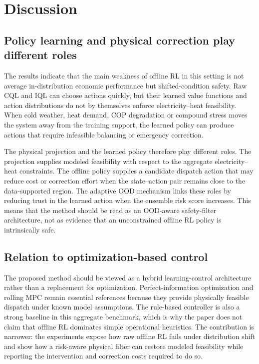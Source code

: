 \documentclass[preprint,12pt]{elsarticle}
\begin{document}
\section{Discussion}

\subsection{Policy learning and physical correction play different roles}

The results indicate that the main weakness of offline RL in this setting is not average in-distribution economic performance but shifted-condition safety. Raw CQL and IQL can choose actions quickly, but their learned value functions and action distributions do not by themselves enforce electricity--heat feasibility. When cold weather, heat demand, COP degradation or compound stress moves the system away from the training support, the learned policy can produce actions that require infeasible balancing or emergency correction.

The physical projection and the learned policy therefore play different roles. The projection supplies modeled feasibility with respect to the aggregate electricity--heat constraints. The offline policy supplies a candidate dispatch action that may reduce cost or correction effort when the state--action pair remains close to the data-supported region. The adaptive OOD mechanism links these roles by reducing trust in the learned action when the ensemble risk score increases. This means that the method should be read as an OOD-aware safety-filter architecture, not as evidence that an unconstrained offline RL policy is intrinsically safe.

\subsection{Relation to optimization-based control}

The proposed method should be viewed as a hybrid learning-control architecture rather than a replacement for optimization. Perfect-information optimization and rolling MPC remain essential references because they provide physically feasible dispatch under known model assumptions. The rule-based controller is also a strong baseline in this aggregate benchmark, which is why the paper does not claim that offline RL dominates simple operational heuristics. The contribution is narrower: the experiments expose how raw offline RL fails under distribution shift and show how a risk-aware physical filter can restore modeled feasibility while reporting the intervention and correction costs required to do so.
\end{document}
